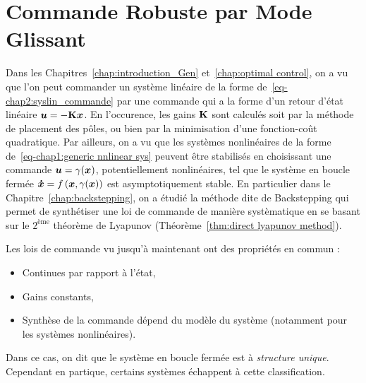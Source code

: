 \graphicspath{{Figures/}}
\chapter{Commande Robuste par Mode Glissant} \label{chap:robust control}
Dans les Chapitres~\ref{chap:introduction_Gen} et~\ref{chap:optimal control}, on a vu que l'on peut commander un système linéaire de la forme de~\eqref{eq-chap2:syslin_commande} par une commande qui a la forme d'un retour d'état linéaire $\bm{u} = -\mathbf{K}\bm{x}$. En l'occurence, les gains $\mathbf{K}$ sont calculés soit par la méthode de placement des pôles, ou bien par la minimisation d'une fonction-coût quadratique. Par ailleurs, on a vu que les systèmes nonlinéaires de la forme de~\eqref{eq-chap1:generic nnlinear sys} peuvent être stabilisés en choisissant une commande $\bm{u} = \gamma(\bm{x})$, potentiellement nonlinéaires, tel que le système en boucle fermée $\bm{\dot{x}} = f\left(\bm{x},\gamma(\bm{x})\right)$ est asymptotiquement stable.  En particulier  dans le Chapitre~\ref{chap:backstepping}, on a étudié la méthode dite de Backstepping qui permet de synthétiser une loi de commande de manière systèmatique en se basant sur le $2^\text{ème}$ théorème de Lyapunov (Théorème~\ref{thm:direct lyapunov method}). 

Les lois de commande vu jusqu'à maintenant ont des propriétés en commun : 
\begin{itemize}
	\item Continues par rapport à l'état,
	\item Gains constants,
	\item Synthèse de la commande dépend du modèle du système (notamment pour les systèmes nonlinéaires).
\end{itemize}
Dans ce cas, on dit que le système en boucle fermée est à \emph{structure unique}. Cependant en partique, certains systèmes échappent à cette classification. 
